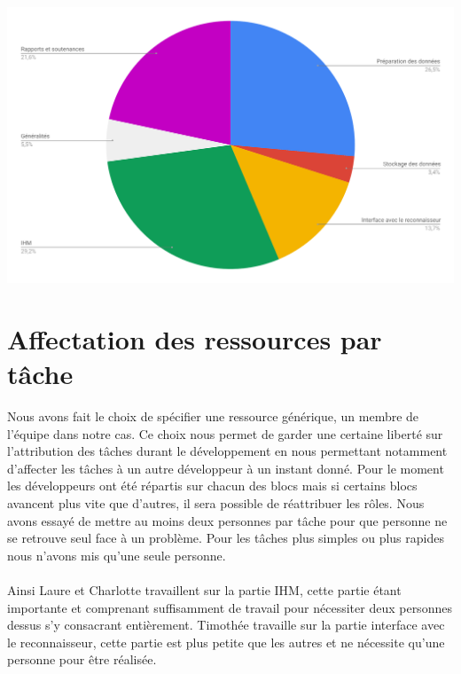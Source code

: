 \paragraph{}

\begin{mdframed}[frametitle={Figure 2 : Diagramme de répartition du travail par bloc}, innerbottommargin=10]
\begin{center}
\includegraphics[scale=0.44]{repartition_travail_blocs.pdf}
\end{center}
\end{mdframed}

\section{Affectation des ressources par tâche}

Nous avons fait le choix de spécifier une ressource générique, un membre de l’équipe dans notre cas. Ce choix nous permet de garder une certaine liberté sur l’attribution des tâches durant le développement en nous permettant notamment d’affecter les tâches à un autre développeur à un instant donné. Pour le moment les développeurs ont été répartis sur chacun des blocs mais si certains blocs avancent plus vite que d’autres, il sera possible de réattribuer les rôles. Nous avons essayé de mettre au moins deux personnes par tâche pour que personne ne se retrouve seul face à un problème. Pour les tâches plus simples ou plus rapides nous n'avons mis qu'une seule personne.

\paragraph{}

Ainsi Laure et Charlotte travaillent sur la partie IHM, cette partie étant importante et comprenant suffisamment de travail pour nécessiter deux personnes dessus s’y consacrant entièrement. Timothée travaille sur la partie interface avec le reconnaisseur, cette partie est plus petite que les autres et ne nécessite qu’une personne pour être réalisée. 

